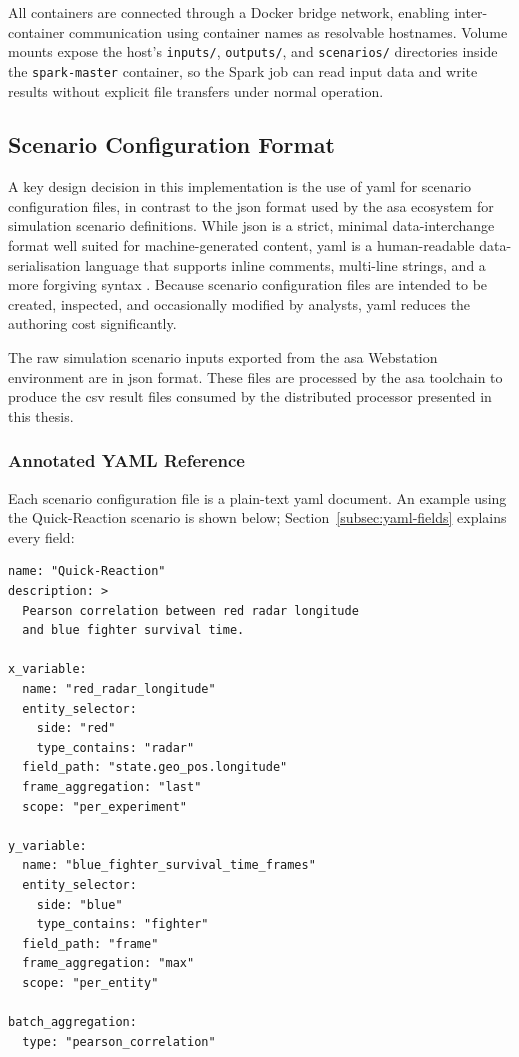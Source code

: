 All containers are connected through a Docker bridge network, enabling inter-container communication
using container names as resolvable hostnames. Volume mounts expose the host's \texttt{inputs/},
\texttt{outputs/}, and \texttt{scenarios/} directories inside the \texttt{spark-master} container,
so the Spark job can read input data and write results without explicit file transfers under normal
operation.

\subsection{Scenario Configuration Format}
\label{sec:scenario-config}

A key design decision in this implementation is the use of \gls{yaml} for scenario configuration
files, in contrast to the \gls{json} format used by the \gls{asa} ecosystem for simulation scenario
definitions. While \gls{json} is a strict, minimal data-interchange format well suited for
machine-generated content, \gls{yaml} is a human-readable data-serialisation language that supports
inline comments, multi-line strings, and a more forgiving syntax \parencite{benkiki2009yaml}.
Because scenario configuration files are intended to be created, inspected, and occasionally
modified by analysts, \gls{yaml} reduces the authoring cost significantly.

The raw simulation scenario inputs exported from the \gls{asa} Webstation environment are in
\gls{json} format.  These files are processed by the \gls{asa} toolchain to produce the
\gls{csv} result files consumed by the distributed processor presented in this thesis.

\subsubsection{Annotated YAML Reference}
\label{subsec:yaml-reference}

Each scenario configuration file is a plain-text \gls{yaml} document.  An example using the
Quick-Reaction scenario is shown below; Section~\ref{subsec:yaml-fields} explains every field:

\begin{verbatim}
name: "Quick-Reaction"
description: >
  Pearson correlation between red radar longitude
  and blue fighter survival time.

x_variable:
  name: "red_radar_longitude"
  entity_selector:
    side: "red"
    type_contains: "radar"
  field_path: "state.geo_pos.longitude"
  frame_aggregation: "last"
  scope: "per_experiment"

y_variable:
  name: "blue_fighter_survival_time_frames"
  entity_selector:
    side: "blue"
    type_contains: "fighter"
  field_path: "frame"
  frame_aggregation: "max"
  scope: "per_entity"

batch_aggregation:
  type: "pearson_correlation"
\end{verbatim}

